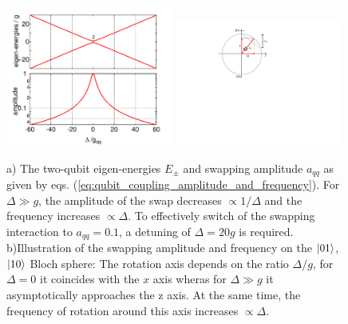 \begin{figure}[hb!]
	\centering
	\includegraphics[width=0.49\textwidth]{./material/mathematica/qubit_qubit_coupling}
	\includegraphics[width=0.49\textwidth]{./material/figures/introduction/bloch_sphere_coupling_illustration}
	\caption[]{a) The two-qubit eigen-energies $E_\pm$ and swapping amplitude $a_{qq}$ as given by eqs. (\ref{eq:qubit_coupling_amplitude_and_frequency}). For $\Delta \gg g$, the amplitude of the swap decreases $\propto 1/\Delta$ and the frequency increases $\propto \Delta$. To effectively switch of the swapping interaction to $a_{qq}=0.1$, a detuning of $\Delta = 20 g$ is required. b)Illustration of the swapping amplitude and frequency on the $\left| 01 \right>$,$\left| 10 \right>$ Bloch sphere: The rotation axis depends on the ratio $\Delta/g$, for $\Delta=0$ it coincides with the $x$ axis wheras for $\Delta \gg g$ it asymptotically approaches the z axis. At the same time, the frequency of rotation around this axis increases $\propto \Delta$. }
	\label{fig:qubit_coupling_amplitude_and_frequency}
\end{figure}

